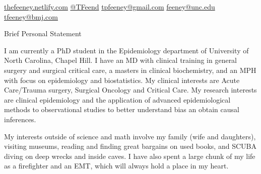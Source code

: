 \documentclass{resume} %
\begin{document}
%

\begin{center}
 \href{https://thefeeney.netlify.com}{thefeeney.netlify.com}
  \hspace*{0.3in}  
 \href{https://twitter.com/TFeend}{@TFeend}
  \hspace*{0.3in}  
   \href{mailto:tpfeeney@gmail.com}{tpfeeney@gmail.com}
  \hspace*{0.3in}  
  \href{mailto:feeney@unc.edu}{feeney@unc.edu}
  \hspace*{0.3in}  
  \href{mailto:tfeeney@bmj.com}{tfeeney@bmj.com}
  \end{center}

\begin{rSection}{Brief Personal Statement}


{I am currently a PhD student in the Epidemiology department of University of North Carolina, Chapel Hill.
I have an MD with clinical training in general surgery and surgical critical care, a masters in clinical biochemistry, and an MPH
 with focus on epidemiology and biostatistics. My clinical interests are Acute Care/Trauma surgery, Surgical Oncology and
  Critical Care. My research interests are clinical epidemiology and the application of advanced 
  epidemiological methods to observational studies to better understand bias an obtain causal inferences.

My interests outside of science and math involve my family (wife and daughters), visiting museums, reading 
and finding great bargains on used books, and SCUBA diving on deep wrecks and inside caves. I have also spent
 a large chunk of my life as a firefighter and an EMT, which will always hold a place in my heart.}

\end{rSection}
\end{document}
